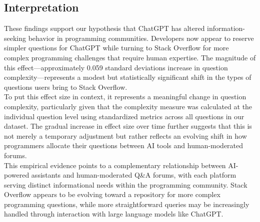 
\subsection{Interpretation}

These findings support our hypothesis that ChatGPT has altered information-seeking behavior in programming communities. Developers now appear to reserve simpler questions for ChatGPT while turning to Stack Overflow for more complex programming challenges that require human expertise. The magnitude of this effect—approximately 0.059 standard deviations increase in question complexity—represents a modest but statistically significant shift in the types of questions users bring to Stack Overflow.\\

To put this effect size in context, it represents a meaningful change in question complexity, particularly given that the complexity measure was calculated at the individual question level using standardized metrics across all questions in our dataset. The gradual increase in effect size over time further suggests that this is not merely a temporary adjustment but rather reflects an evolving shift in how programmers allocate their questions between AI tools and human-moderated forums.\\

This empirical evidence points to a complementary relationship between AI-powered assistants and human-moderated Q\&A forums, with each platform serving distinct informational needs within the programming community. Stack Overflow appears to be evolving toward a repository for more complex programming questions, while more straightforward queries may be increasingly handled through interaction with large language models like ChatGPT.